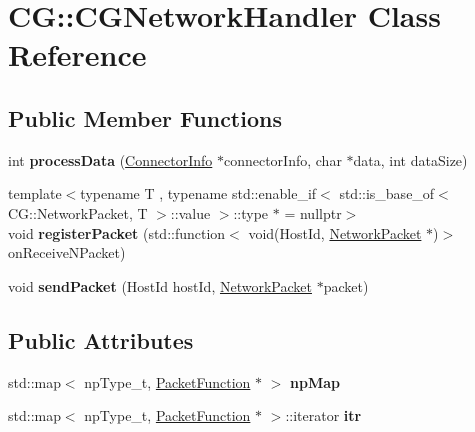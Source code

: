 \hypertarget{class_c_g_1_1_c_g_network_handler}{}\section{CG\+:\+:C\+G\+Network\+Handler Class Reference}
\label{class_c_g_1_1_c_g_network_handler}
\subsection*{Public Member Functions}
\begin{DoxyCompactItemize}
\item 
\mbox{\label{class_c_g_1_1_c_g_network_handler_a597cfc31218fb6ee2e06eb626917b0c4}} 
int {\bfseries process\+Data} (\mbox{\hyperlink{class_c_g_1_1_connector_info}{Connector\+Info}} $\ast$connector\+Info, char $\ast$data, int data\+Size)
\item 
\mbox{\label{class_c_g_1_1_c_g_network_handler_a1bcbb6de607fec8664ace5427ae0f911}} 
{\footnotesize template$<$typename T , typename std\+::enable\+\_\+if$<$ std\+::is\+\_\+base\+\_\+of$<$ C\+G\+::\+Network\+Packet, T $>$\+::value $>$\+::type $\ast$  = nullptr$>$ }\\void {\bfseries register\+Packet} (std\+::function$<$ void(Host\+Id, \mbox{\hyperlink{class_c_g_1_1_network_packet}{Network\+Packet}} $\ast$)$>$ on\+Receive\+N\+Packet)
\item 
\mbox{\label{class_c_g_1_1_c_g_network_handler_af007aa7b64add10eb269e445db6800d2}} 
void {\bfseries send\+Packet} (Host\+Id host\+Id, \mbox{\hyperlink{class_c_g_1_1_network_packet}{Network\+Packet}} $\ast$packet)
\end{DoxyCompactItemize}
\subsection*{Public Attributes}
\begin{DoxyCompactItemize}
\item 
\mbox{\label{class_c_g_1_1_c_g_network_handler_af8c3950b916ed65461534d14185f059d}} 
std\+::map$<$ np\+Type\+\_\+t, \mbox{\hyperlink{class_c_g_1_1_packet_function}{Packet\+Function}} $\ast$ $>$ {\bfseries np\+Map}
\item 
\mbox{\label{class_c_g_1_1_c_g_network_handler_a146e1a5895d3c91cdef43890fcc65a68}} 
std\+::map$<$ np\+Type\+\_\+t, \mbox{\hyperlink{class_c_g_1_1_packet_function}{Packet\+Function}} $\ast$ $>$\+::iterator {\bfseries itr}
\end{DoxyCompactItemize}
